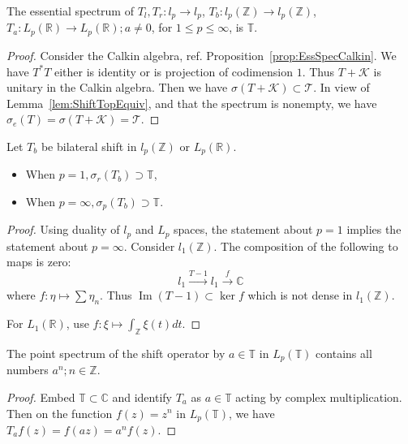 \begin{proposition}
	\label{prop:SpectEssShift}
	The essential spectrum of $T_l, T_r: l_p \to l_p$, $T_b: l_p(\mathbb{Z}) \to l_p(\mathbb{Z})$, $T_a: L_p(\mathbb{R}) \to L_p(\mathbb{R}); a \neq 0$, for $1 \le p \le \infty $, is $\mathbb{T}$.
\end{proposition}
\begin{proof}
	Consider the Calkin algebra, ref. Proposition~\ref{prop:EssSpecCalkin}. We have $T^* T$ either is identity or is projection of codimension $1$. Thus $T + \mathcal{K}$ is unitary in the Calkin algebra. Then we have $\sigma(T + \mathcal{K}) \subset \mathcal{T}$. In view of Lemma~\ref{lem:ShiftTopEquiv}, and that the spectrum is nonempty, we have $\sigma_e(T) = \sigma(T + \mathcal{K}) = \mathcal{T}$.
\end{proof}



\begin{claim}
	Let $T_b$ be bilateral shift in $l_p(\mathbb{Z})$ or $L_p(\mathbb{R})$.
	\begin{itemize}
		\item When $p = 1, \sigma_r(T_b) \supset \mathbb{T}$,
		\item When $p = \infty , \sigma_p(T_b) \supset \mathbb{T}$.
	\end{itemize}
\end{claim}
\begin{proof}
	
	Using duality of $l_p$ and $L_p$ spaces, the statement about $p = 1$ implies the statement about $p = \infty $. Consider $l_1(\mathbb{Z})$. The composition of the following to maps is zero:
	\[
		l_1 \xrightarrow{T - 1} l_1 \xrightarrow{f} \mathbb{C}
	\] 
	where $f: \eta \mapsto \sum \eta_n$. Thus $\operatorname{Im} (T - 1) \subset \operatorname{ker} f$ which is not dense in $l_1(\mathbb{Z})$.

	For $L_1(\mathbb{R})$, use $f: \xi \mapsto \int_{\mathbb{Z}} \xi(t) d t$.
\end{proof}

\begin{claim}
	The point spectrum of the shift operator by $a \in \mathbb{T}$ in $L_p(\mathbb{T})$ contains all numbers $a^n; n \in \mathbb{Z}$.
\end{claim}
\begin{proof}
	Embed $\mathbb{T} \subset \mathbb{C}$ and identify $T_a$ as $a \in \mathbb{T}$ acting by complex multiplication. Then on the function $f(z) = z^n$ in $ L_p(\mathbb{T})$, we have $T_a f (z) = f(a z)= a^n f(z)$.
\end{proof}



